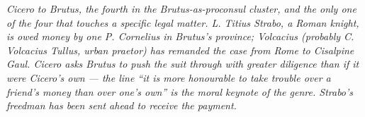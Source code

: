 
\textit{Cicero to Brutus, the fourth in the Brutus-as-proconsul
cluster, and the only one of the four that touches a specific legal
matter. L. Titius Strabo, a Roman knight, is owed money by one
P. Cornelius in Brutus's province; Volcacius (probably C. Volcacius
Tullus, urban praetor) has remanded the case from Rome to Cisalpine
Gaul. Cicero asks Brutus to push the suit through with greater
diligence than if it were Cicero's own --- the line ``it is more
honourable to take trouble over a friend's money than over one's
own'' is the moral keynote of the genre. Strabo's freedman has been
sent ahead to receive the payment.}
